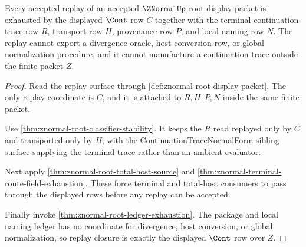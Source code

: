 \begin{theorem}\label{thm:znormal-root-cont-replay-closure}
Every accepted replay of an accepted $\ZNormalUp$ root display packet is exhausted by the displayed $\Cont$ row $C$ together with the terminal continuation-trace row $R$, transport row $H$, provenance row $P$, and local naming row $N$. The replay cannot export a divergence oracle, host conversion row, or global normalization procedure, and it cannot manufacture a continuation trace outside the finite packet $Z$.
\end{theorem}
\begin{proof}
Read the replay surface through \autoref{def:znormal-root-display-packet}. The only replay coordinate is $C$, and it is attached to $R,H,P,N$ inside the same finite packet.

Use \autoref{thm:znormal-root-classifier-stability}. It keeps the $R$ read replayed only by $C$ and transported only by $H$, with the ContinuationTraceNormalForm sibling surface supplying the terminal trace rather than an ambient evaluator.

Next apply \autoref{thm:znormal-root-total-host-source} and \autoref{thm:znormal-terminal-route-field-exhaustion}. These force terminal and total-host consumers to pass through the displayed rows before any replay can be accepted.

Finally invoke \autoref{thm:znormal-root-ledger-exhaustion}. The package and local naming ledger has no coordinate for divergence, host conversion, or global normalization, so replay closure is exactly the displayed $\Cont$ row over $Z$.
\end{proof}


